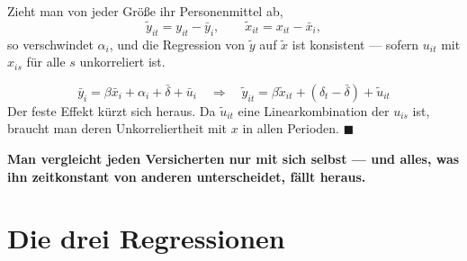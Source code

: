 \begin{merksatz}
Zieht man von jeder Größe ihr Personenmittel ab,
\[ \tilde y_{it} = y_{it} - \bar y_i, \qquad \tilde x_{it} = x_{it} - \bar x_i , \]
so verschwindet $\alpha_i$, und die Regression von $\tilde y$ auf $\tilde x$ ist konsistent --- sofern $u_{it}$ mit $x_{is}$ für alle $s$ unkorreliert ist.

\[ \bar y_i = \beta\bar x_i + \alpha_i + \bar\delta + \bar u_i \quad\Longrightarrow\quad \tilde y_{it} = \beta\tilde x_{it} + (\delta_t-\bar\delta) + \tilde u_{it} \]
Der feste Effekt kürzt sich heraus. Da $\tilde u_{it}$ eine Linearkombination der $u_{is}$ ist, braucht man deren Unkorreliertheit mit $x$ in allen Perioden. $\blacksquare$

\begin{center}
\begin{minipage}{0.9\textwidth}
\textbf{Man vergleicht jeden Versicherten nur mit sich selbst --- und alles, was ihn zeitkonstant von anderen unterscheidet, fällt heraus.}
\end{minipage}
\end{center}

\begin{center}
\begin{minipage}{0.88\textwidth}
\end{minipage}
\end{center}
\end{merksatz}

\section{Die drei Regressionen}

